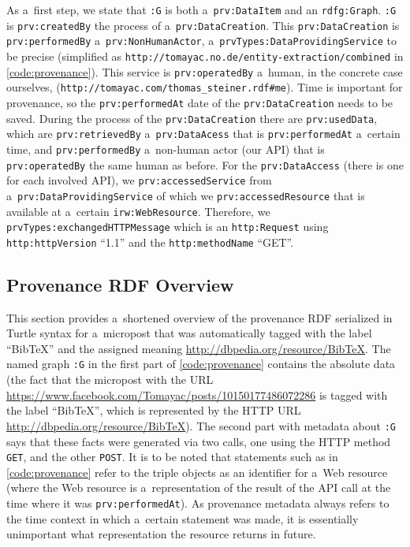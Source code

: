 As a~first step, we state that \texttt{:G} is both a~\texttt{prv:DataItem}
and an \texttt{rdfg:Graph}.
\texttt{:G} is \texttt{prv:createdBy} the process of
a~\texttt{prv:DataCreation}.
This \texttt{prv:DataCreation} is \texttt{prv:performedBy}
a~\texttt{prv:NonHumanActor},
a~\texttt{prvTypes:DataProvidingService}
to be precise (simplified as
\texttt{http://tomayac.no.de/entity-extraction/combined}
in \autoref{code:provenance}).
This service is \texttt{prv:operatedBy} a~human,
in the concrete case ourselves,
(\texttt{http://tomayac.com/thomas\_steiner.rdf\#me}).
Time is important for provenance,
so the \texttt{prv:performedAt} date of
the \texttt{prv:DataCreation}
needs to be saved.
During the process of the \texttt{prv:DataCreation}
there are \texttt{prv:usedData},
which are \texttt{prv:retrievedBy} a~\texttt{prv:DataAcess}
that is \texttt{prv:performedAt} a~certain time,
and \texttt{prv:performedBy} a~non-human actor
(our API) that is \texttt{prv:operatedBy}
the same human as before.
For the \texttt{prv:DataAccess}
(there is one for each involved API),
we \texttt{prv:accessedService} from
a~\texttt{prv:DataProvidingService} of which we
\texttt{prv:accessedResource} that is available at
a~certain \texttt{irw:WebResource}.
Therefore, we \texttt{prvTypes:exchangedHTTPMessage} which is an
\texttt{http:Request} using \texttt{http:httpVersion} ``1.1''
and the \texttt{http:methodName} ``GET''.

\subsection{Provenance RDF Overview}

This section provides a~shortened overview of the provenance RDF
serialized in Turtle syntax for a~micropost that was automatically
tagged with the label ``BibTeX''
and the assigned meaning
\url{http://dbpedia.org/resource/BibTeX}.
The named graph \texttt{:G} in the first part
of \autoref{code:provenance}
contains the absolute data (the fact that the micropost with
the URL
\url{https://www.facebook.com/Tomayac/posts/10150177486072286}
is tagged with the label ``BibTeX'', which is represented by
the HTTP URL \url{http://dbpedia.org/resource/BibTeX}).
The second part with metadata about \texttt{:G} says that
these facts were generated via two calls,
one using the HTTP method \texttt{GET},
and the other \texttt{POST}.
It is to be noted that statements
such as in \autoref{code:provenance}
refer to the triple objects as an identifier for a~Web resource
(where the Web resource is a~representation of the result of the
API call at the time where it was \texttt{prv:performedAt}).
As provenance metadata always refers to the time context
in which a~certain statement was made,
it is essentially unimportant
what representation the resource returns in future.

